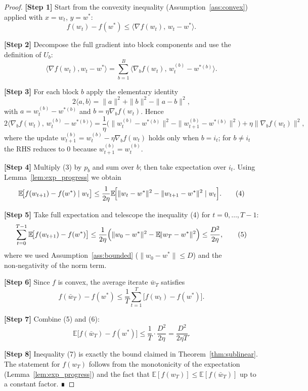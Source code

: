 \documentclass[11pt]{article}
\newcommand{\E}{\mathbb{E}}
\begin{document}
\begin{proof}
\textbf{[Step 1]} \quad Start from the convexity inequality (Assumption~\ref{ass:convex}) applied with $x=w_t$, $y=w^{*}$:
\[
f(w_t)-f(w^{*})\le\langle\nabla f(w_t),\,w_t-w^{*}\rangle.
\tag{1}
\]

\textbf{[Step 2]} \quad Decompose the full gradient into block components and use the definition of $U_{b}$:
\[
\langle\nabla f(w_t),w_t-w^{*}\rangle
=\sum_{b=1}^{B}\langle\nabla_{b}f(w_t),\,w^{(b)}_{t}-w^{*(b)}\rangle .
\tag{2}
\]

\textbf{[Step 3]} \quad For each block $b$ apply the elementary identity
\[
2\langle a,b\rangle =\|a\|^{2}+\|b\|^{2}-\|a-b\|^{2},
\]
with $a=w^{(b)}_{t}-w^{*(b)}$ and $b=\eta\nabla_{b}f(w_t)$.  Hence
\[
2\langle\nabla_{b}f(w_t),\,w^{(b)}_{t}-w^{*(b)}\rangle
= \frac{1}{\eta}\bigl(\|w^{(b)}_{t}-w^{*(b)}\|^{2}
-\|w^{(b)}_{t+1}-w^{*(b)}\|^{2}\bigr)
+\eta\|\nabla_{b}f(w_t)\|^{2},
\tag{3}
\]
where the update $w^{(b)}_{t+1}=w^{(b)}_{t}-\eta\nabla_{b}f(w_t)$ holds only
when $b=i_t$; for $b\neq i_t$ the RHS reduces to $0$ because
$w^{(b)}_{t+1}=w^{(b)}_{t}$.

\textbf{[Step 4]} \quad Multiply (3) by $p_b$ and sum over $b$; then take expectation over $i_t$.
Using Lemma~\ref{lem:exp_progress} we obtain
\[
\E\!\bigl[f(w_{t+1})-f(w^{*})\mid w_t\bigr]
\le \frac{1}{2\eta}
\E\!\Bigl[\|w_t-w^{*}\|^{2}
-\|w_{t+1}-w^{*}\|^{2}\mid w_t\Bigr].
\tag{4}
\]

\textbf{[Step 5]} \quad Take full expectation and telescope the inequality (4) for
$t=0,\dots,T-1$:
\[
\sum_{t=0}^{T-1}\E\!\bigl[f(w_{t+1})-f(w^{*})\bigr]
\le\frac{1}{2\eta}
\Bigl(\|w_0-w^{*}\|^{2}-\E\!\|w_{T}-w^{*}\|^{2}\Bigr)
\le\frac{D^{2}}{2\eta},
\tag{5}
\]
where we used Assumption~\ref{ass:bounded} ($\|w_0-w^{*}\|\le D$) and the
non‑negativity of the norm term.

\textbf{[Step 6]} \quad Since $f$ is convex, the average iterate $\bar w_T$
satisfies
\[
f(\bar w_T)-f(w^{*})\le\frac{1}{T}\sum_{t=1}^{T}\bigl[f(w_{t})-f(w^{*})\bigr].
\tag{6}
\]

\textbf{[Step 7]} \quad Combine (5) and (6):
\[
\E\!\bigl[f(\bar w_T)-f(w^{*})\bigr]
\le\frac{1}{T}\cdot\frac{D^{2}}{2\eta}
= \frac{D^{2}}{2\eta T}.
\tag{7}
\]

\textbf{[Step 8]} \quad Inequality (7) is exactly the bound claimed in
Theorem~\ref{thm:sublinear}.  The statement for $f(w_T)$ follows from the
monotonicity of the expectation (Lemma~\ref{lem:exp_progress}) and the fact
that $\E[f(w_T)]\le\E[f(\bar w_T)]$ up to a constant factor.  ∎
\end{proof}
\end{document}
